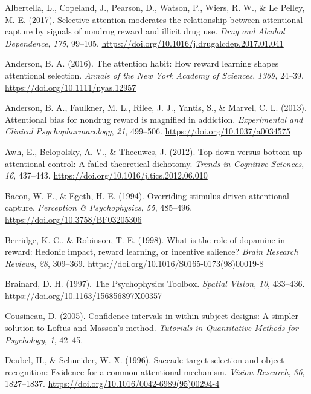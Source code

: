 \documentclass[man, a4paper, noextraspace, 11pt,floatsintext]{apa6}
\begin{document}
\hypertarget{refs}{}
\hypertarget{ref-Albertella2017a}{}
Albertella, L., Copeland, J., Pearson, D., Watson, P., Wiers, R. W., \&
Le Pelley, M. E. (2017). Selective attention moderates the relationship
between attentional capture by signals of nondrug reward and illicit
drug use. \emph{Drug and Alcohol Dependence}, \emph{175}, 99--105.
\url{https://doi.org/10.1016/j.drugalcdep.2017.01.041}

\hypertarget{ref-Anderson2015a}{}
Anderson, B. A. (2016). The attention habit: How reward learning shapes
attentional selection. \emph{Annals of the New York Academy of
Sciences}, \emph{1369}, 24--39. \url{https://doi.org/10.1111/nyas.12957}

\hypertarget{ref-Anderson2013}{}
Anderson, B. A., Faulkner, M. L., Rilee, J. J., Yantis, S., \& Marvel,
C. L. (2013). Attentional bias for nondrug reward is magnified in
addiction. \emph{Experimental and Clinical Psychopharmacology},
\emph{21}, 499--506. \url{https://doi.org/10.1037/a0034575}

\hypertarget{ref-Awh2012}{}
Awh, E., Belopolsky, A. V., \& Theeuwes, J. (2012). Top-down versus
bottom-up attentional control: A failed theoretical dichotomy.
\emph{Trends in Cognitive Sciences}, \emph{16}, 437--443.
\url{https://doi.org/10.1016/j.tics.2012.06.010}

\hypertarget{ref-Bacon1994}{}
Bacon, W. F., \& Egeth, H. E. (1994). Overriding stimulus-driven
attentional capture. \emph{Perception \& Psychophysics}, \emph{55},
485--496. \url{https://doi.org/10.3758/BF03205306}

\hypertarget{ref-Berridge1998}{}
Berridge, K. C., \& Robinson, T. E. (1998). What is the role of dopamine
in reward: Hedonic impact, reward learning, or incentive salience?
\emph{Brain Research Reviews}, \emph{28}, 309--369.
\url{https://doi.org/10.1016/S0165-0173(98)00019-8}

\hypertarget{ref-Brainard1997}{}
Brainard, D. H. (1997). The Psychophysics Toolbox. \emph{Spatial
Vision}, \emph{10}, 433--436.
\url{https://doi.org/10.1163/156856897X00357}

\hypertarget{ref-Cousineau2005}{}
Cousineau, D. (2005). Confidence intervals in within-subject designs: A
simpler solution to Loftus and Masson's method. \emph{Tutorials in
Quantitative Methods for Psychology}, \emph{1}, 42--45.

\hypertarget{ref-Deubel1996}{}
Deubel, H., \& Schneider, W. X. (1996). Saccade target selection and
object recognition: Evidence for a common attentional mechanism.
\emph{Vision Research}, \emph{36}, 1827--1837.
\url{https://doi.org/10.1016/0042-6989(95)00294-4}
\end{document}
